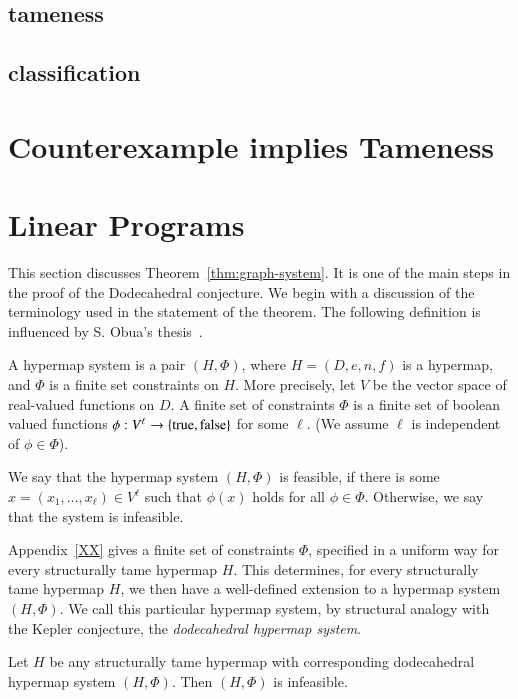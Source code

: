 \subsection{tameness}

\subsection{classification}


\section{Counterexample implies Tameness}

\section{Linear Programs}

This section discusses Theorem~\ref{thm:graph-system}.  It is one of
the main steps in the proof of the Dodecahedral conjecture.
We begin with a discussion of the terminology used in the
statement of the theorem.
The following definition is influenced by S. Obua's thesis~\cite{Ob}.

\begin{definition} A hypermap system is a pair $(H,\Phi)$,
where $H=(D,e,n,f)$ is a hypermap, and $\Phi$ is a finite set constraints on $H$.  More precisely, let $V$ be the vector space of
real-valued functions on $D$.  A finite set of constraints $\Phi$ is a finite
set of boolean valued functions $\phi:V^\ell\to \{{\operatorname{true}},{\operatorname{false}}\}$
for some $\ell$. (We assume $\ell$ is independent of $\phi\in \Phi$).
\end{definition}

We say that the hypermap system $(H,\Phi)$ is feasible, if
there is some $x=(x_1,\ldots,x_\ell)\in V^\ell$ such that
$\phi(x)$ holds for all $\phi\in\Phi$. Otherwise, we say that
the system is infeasible.

Appendix~\ref{XX} gives a finite set of constraints $\Phi$, 
specified
in a uniform way for every structurally tame hypermap $H$.  This determines,
for every structurally tame hypermap $H$, we then have a well-defined extension
to a hypermap system $(H,\Phi)$.  We call this particular hypermap
system, by structural analogy with the Kepler conjecture,
the {\it dodecahedral hypermap system}.  


\begin{theorem}\label{thm:graph-system}  Let 
$H$ be any structurally tame hypermap with corresponding
dodecahedral hypermap system $(H,\Phi)$.  Then $(H,\Phi)$ is infeasible.
\end{theorem}

